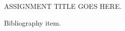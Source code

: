 \documentclass[11pt]{article}
\begin{document}
 

\begin{center}
	{\Large ASSIGNMENT TITLE GOES HERE.}
\end{center}

\lipsum[1-3]

\begin{thebibliography}{9}
	 Bibliography item.
\end{thebibliography}

\end{document}
